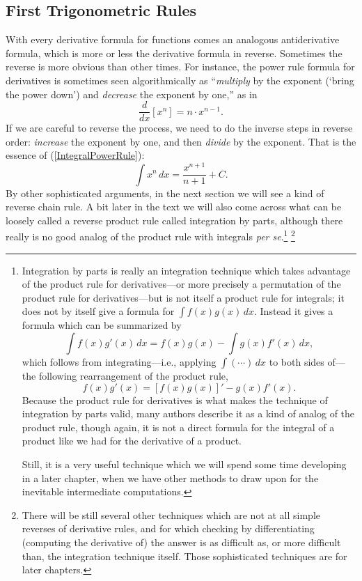 \subsection{First Trigonometric Rules\label{FirstTrigRulesSubsection}}
With every derivative formula for functions comes an analogous
antiderivative formula, which is more or less the derivative
formula in reverse.  Sometimes the reverse is more obvious than
other times.  For instance, the power rule formula for derivatives is sometimes
seen algorithmically as ``{\it multiply} by the exponent (`bring
the power down') and {\it decrease} the exponent by one,''
as in
$$\frac{d}{dx}\left[x^n\right]=n\cdot x^{n-1}.$$  
If we are careful to reverse the process, we need to do
the inverse steps in reverse order:  {\it increase} the exponent
by one, and then {\it divide} by the exponent.  That is the
essence of (\ref{IntegralPowerRule}):
$$\int x^n\,dx=\frac{x^{n+1}}{n+1}+C.$$  
By other sophisticated arguments, in the next section we
will see a kind of reverse chain rule.  A bit later in the text
we will also come across what can be loosely called a
reverse product rule called integration by parts,
although there really is no good analog of the product rule
with integrals {\it per se}.\footnote{%
Integration by parts is really an integration technique
which takes advantage of the product rule for derivatives---or
more precisely a permutation of the product rule for 
derivatives---but is not itself a product rule for integrals;
it does not by itself give a formula for
$\int f(x)g(x)\,dx$.
Instead it gives a formula which can be summarized by
$$\int f(x)g'(x)\,dx=f(x)g(x)-\int g(x)f'(x)\,dx,$$
which follows from integrating---i.e., 
applying $\int(\cdots)\,dx$ to both sides of---the following
rearrangement of the product rule,
$$f(x)g'(x)=[f(x)g(x)]'-g(x)f'(x).$$
Because the product rule for derivatives is what makes the
technique of integration by parts valid, many authors describe
it as a kind of analog of the product rule, though again,
it is not a direct formula for the integral of a product
like we had for the derivative of a product.

Still, it is a very useful technique which we will spend some time
developing in a later chapter, when we have other methods to draw upon
for the inevitable intermediate computations.
} \footnote{
There will be still several other techniques which are not
at all simple reverses of derivative rules, and for which checking
by differentiating (computing the derivative of) the answer
is as difficult as, or more difficult than, the integration
technique itself.  Those sophisticated techniques are for later chapters.
}

